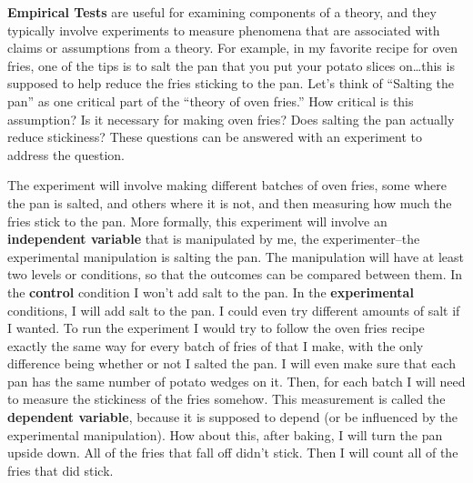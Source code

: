 \documentclass[
  oneside,
  12pt]{crumpbook}
\begin{document}
\textbf{Empirical Tests} are useful for examining components of a theory, and they typically involve experiments to measure phenomena that are associated with claims or assumptions from a theory. For example, in my favorite recipe for oven fries, one of the tips is to salt the pan that you put your potato slices on\ldots this is supposed to help reduce the fries sticking to the pan. Let's think of ``Salting the pan'' as one critical part of the ``theory of oven fries.'' How critical is this assumption? Is it necessary for making oven fries? Does salting the pan actually reduce stickiness? These questions can be answered with an experiment to address the question.

The experiment will involve making different batches of oven fries, some where the pan is salted, and others where it is not, and then measuring how much the fries stick to the pan. More formally, this experiment will involve an \textbf{independent variable} that is manipulated by me, the experimenter--the experimental manipulation is salting the pan. The manipulation will have at least two levels or conditions, so that the outcomes can be compared between them. In the \textbf{control} condition I won't add salt to the pan. In the \textbf{experimental} conditions, I will add salt to the pan. I could even try different amounts of salt if I wanted. To run the experiment I would try to follow the oven fries recipe exactly the same way for every batch of fries of that I make, with the only difference being whether or not I salted the pan. I will even make sure that each pan has the same number of potato wedges on it. Then, for each batch I will need to measure the stickiness of the fries somehow. This measurement is called the \textbf{dependent variable}, because it is supposed to depend (or be influenced by the experimental manipulation). How about this, after baking, I will turn the pan upside down. All of the fries that fall off didn't stick. Then I will count all of the fries that did stick.
\end{document}
